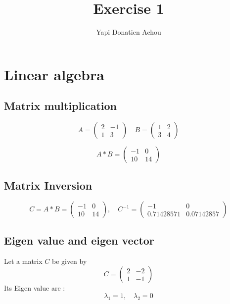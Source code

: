 \documentclass[11pt, oneside]{article}   	%
\title{Exercise 1}
\author{Yapi Donatien Achou}
\begin{document}
\maketitle
\section{Linear algebra}
\subsection{Matrix multiplication}
\begin{equation}
A = 
\begin{pmatrix}
2 & -1 \\
1 & 3
\end{pmatrix}
\quad 
B= 
\begin{pmatrix}
1 & 2 \\
3 & 4  \nonumber
\end{pmatrix}
\end{equation}

\begin{equation}
A*B = \begin{pmatrix}
-1 & 0 \\
10 & 14  \nonumber
\end{pmatrix}
\end{equation}

\subsection{Matrix Inversion}
\begin{equation}
 C = A*B = \begin{pmatrix}
-1 & 0 \\
10 & 14  \nonumber
\end{pmatrix}
,\quad
C^{-1}= \begin{pmatrix}
-1 & 0 \\
0.71428571 & 0.07142857  \nonumber
\end{pmatrix}
\end{equation}

\subsection{Eigen value and eigen vector}
Let a matrix $C$ be given by
\begin{equation}
C = \begin{pmatrix}
2 & -2 \\
1 & -1    \nonumber
\end{pmatrix}
\end{equation}
Its Eigen value are :
\begin{equation}
\lambda_{1} = 1, \quad \lambda_{2} = 0 \nonumber
\end{equation}
\end{document}

